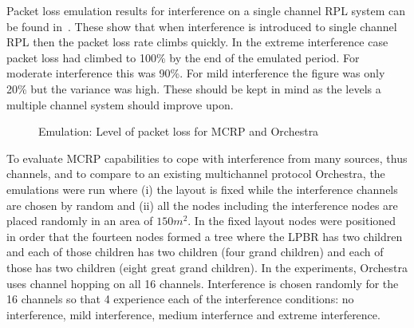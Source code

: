 
Packet loss emulation results for interference on a single channel RPL system can be found in~\cite{mcrp}. These show that when interference is introduced to single channel RPL then the packet loss rate climbs quickly.  In the extreme interference case packet loss had climbed to 100\% by the end of the emulated period. For moderate interference this was 90\%.  For mild interference the figure was only 20\% but the variance was high.  These should be kept in mind as the levels a multiple channel system should improve upon.

\begin{figure}
\centering
{}
\caption{Emulation: Level of packet loss for MCRP and Orchestra}
\label{fig:layouts}
\end{figure}


To evaluate MCRP capabilities to cope with interference from many sources, thus channels, and to compare to an existing multichannel protocol Orchestra, the emulations were run where (i) the layout is fixed while the interference channels are chosen by random and (ii) all the nodes including the interference nodes are placed randomly in an area of $150m^2$.  In the fixed layout nodes were positioned in order that the fourteen nodes formed a tree where the LPBR has two children and each of those children has two children (four grand children) and each of those has two children (eight great grand children).
In the experiments, Orchestra uses channel hopping on all 16 channels.  Interference is chosen randomly for the 16 channels so that 4 experience each of the interference conditions: no interference, mild interference, medium interfernce and extreme interference.


